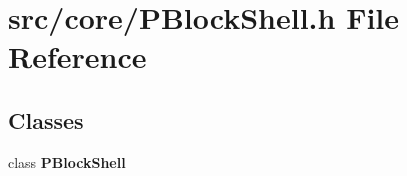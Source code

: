 \section{src/core/PBlock\-Shell.h File Reference}
\label{PBlockShell_8h}


\subsection*{Classes}
\begin{CompactItemize}
\item 
class {\bf PBlock\-Shell}
\end{CompactItemize}
